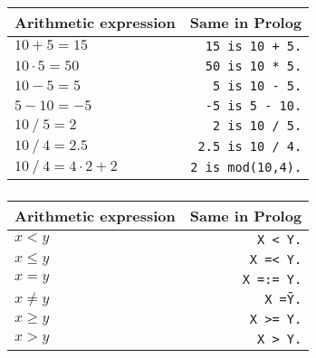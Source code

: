 \begin{frame}
	\frametitle{\insertsection}
	
	\begin{table}
		\centering
		\begin{tabular}{ l | r }
			\rowcolor{Gray}
			\textbf{Arithmetic expression} & \textbf{Same in Prolog} \\
			\hline
			\rowcolor{LightGray}\( 10 + 5 = 15 \) & \texttt{15 is 10 + 5.}   \\
			\rowcolor{LightGray}\( 10\cdot 5 = 50 \)  & \texttt{50 is 10 * 5.}   \\
			\rowcolor{LightGray}\( 10 - 5 = 5 \)  & \texttt{5 is 10 - 5.}   \\
			\rowcolor{LightGray}\( 5 - 10 = -5 \)  & \texttt{-5 is 5 - 10.}   \\
			\rowcolor{LightGray}\( 10~/~5 = 2 \)  & \texttt{2 is 10 / 5.}   \\
			\rowcolor{LightGray}\( 10~/~4 = 2.5 \)  & \texttt{2.5 is 10 / 4.}   \\
			\rowcolor{LightGray}\( 10~/~4 = 4\cdot 2 + 2 \)  & \texttt{2 is mod(10,4).}  \\
		\end{tabular}
	\end{table}
	
\end{frame}


\begin{frame}
	\frametitle{\insertsection}
	
	\begin{table}
		\centering
		\begin{tabular}{ l | r }
			\rowcolor{Gray}
			\textbf{Arithmetic expression}   & \textbf{Same in Prolog} \\
			\hline
			\rowcolor{LightGray}\( x < y \) & \texttt{X < Y.}  \\
			\rowcolor{LightGray}\( x\leqslant y \)  & \texttt{X =< Y.}   \\
			\rowcolor{LightGray}\( x = y \)  & \texttt{X =:= Y.}  \\
			\rowcolor{LightGray}\( x\neq y \)  & \texttt{X =\= Y.}  \\
			\rowcolor{LightGray}\( x\geqslant y \)  & \texttt{X >= Y.}  \\
			\rowcolor{LightGray}\( x > y \)  & \texttt{X > Y.} \\
		\end{tabular}
	\end{table}
	
\end{frame}


